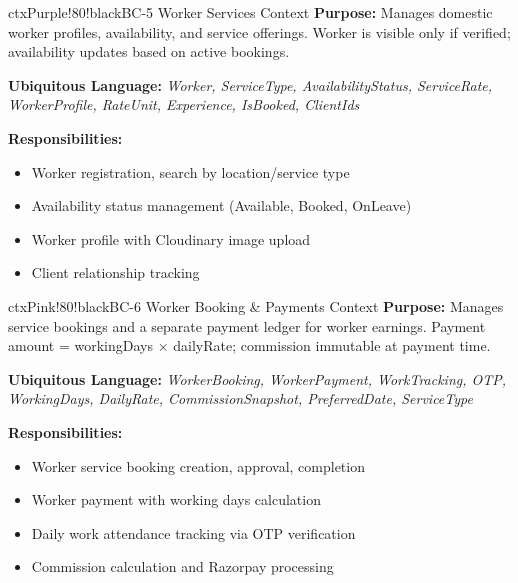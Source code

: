 \documentclass[12pt,a4paper]{article}
\begin{document}
\vspace{0.5em}

\begin{contextbox}{ctxPurple!80!black}{BC-5 \quad Worker Services Context}
\textbf{Purpose:} Manages domestic worker profiles, availability, and service offerings. Worker is visible only if verified; availability updates based on active bookings.

\textbf{Ubiquitous Language:} \textit{Worker, ServiceType, AvailabilityStatus, ServiceRate, WorkerProfile, RateUnit, Experience, IsBooked, ClientIds}

\textbf{Responsibilities:}
\begin{itemize}
  \item Worker registration, search by location/service type
  \item Availability status management (Available, Booked, OnLeave)
  \item Worker profile with Cloudinary image upload
  \item Client relationship tracking
\end{itemize}
\end{contextbox}

\vspace{0.5em}

\begin{contextbox}{ctxPink!80!black}{BC-6 \quad Worker Booking \& Payments Context}
\textbf{Purpose:} Manages service bookings and a separate payment ledger for worker earnings. Payment amount = workingDays $\times$ dailyRate; commission immutable at payment time.

\textbf{Ubiquitous Language:} \textit{WorkerBooking, WorkerPayment, WorkTracking, OTP, WorkingDays, DailyRate, CommissionSnapshot, PreferredDate, ServiceType}

\textbf{Responsibilities:}
\begin{itemize}
  \item Worker service booking creation, approval, completion
  \item Worker payment with working days calculation
  \item Daily work attendance tracking via OTP verification
  \item Commission calculation and Razorpay processing
\end{itemize}
\end{contextbox}

\vspace{0.5em}
\end{document}
